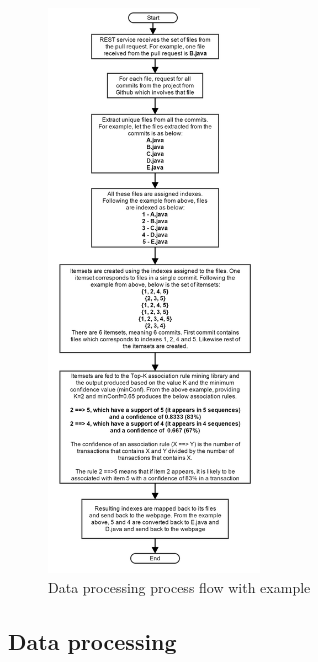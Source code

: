 \begin{figure}[ht!]
\includegraphics[width=0.5\textwidth]{data_processing_spmf}
\caption{Data processing process flow with example}
\label{fig:data_processing_spmf}
\end{figure}

\subsection{Data processing}
\label{sec:dataprocessing}


